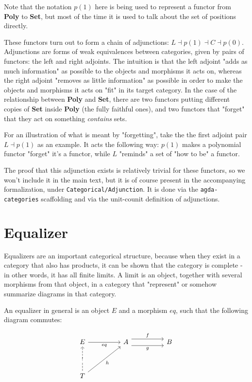 Note that the notation $p(1)$ here is being used to represent a functor from \textbf{Poly} to \textbf{Set}, but most of the time it is used to talk about the set of positions directly.

These functors turn out to form a chain of adjunctions: $L \dashv p(1) \dashv C \dashv p(0)$. Adjunctions are forms of weak equivalences between categories, given by pairs of functors: the left and right adjoints. The intuition is that the left adjoint "adds as much information" as possible to the objects and morphisms it acts on, whereas the right adjoint "removes as little information" as possible in order to make the objects and morphisms it acts on "fit" in its target category. In the case of the relationship between \textbf{Poly} and \textbf{Set}, there are two functors putting different copies of \textbf{Set} inside \textbf{Poly} (the fully faithful ones), and two functors that "forget" that they act on something \textit{contains} sets. 

For an illustration of what is meant by "forgetting", take the the first adjoint pair $L \dashv p(1)$ as an example. It acts the following way: $p(1)$ makes a polynomial functor "forget" it's a functor, while $L$ "reminds" a set of "how to be" a functor.

The proof that this adjunction exists is relatively trivial for these functors, so we won't include it in the main text, but it is of course present in the accompanying formalization, under \texttt{Categorical/Adjunction}. It is done via the \texttt{agda-categories} scaffolding and via the unit-counit definition of adjunctions.

\section{Equalizer}

Equalizers are an important categorical structure, because when they exist in a category that also has products, it can be shown that the category is complete - in other words, it has all finite limits. A limit is an object, together with several morphisms from that object, in a category that "represent" or somehow summarize diagrams in that category.

An equalizer in general is an object $E$ and a morphism $eq$, such that the following diagram commutes:

\[\begin{tikzcd}
	E && A && B \\
	\\
	T
	\arrow["g"', shift right=2, from=1-3, to=1-5]
	\arrow["f", shift left=2, from=1-3, to=1-5]
	\arrow["eq"', from=1-1, to=1-3]
	\arrow["h"', from=3-1, to=1-3]
	\arrow["{!}"{description}, dashed, from=3-1, to=1-1]
\end{tikzcd}\]

